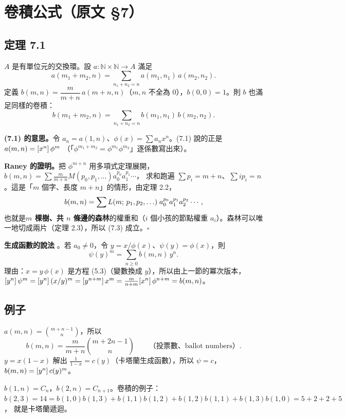\section{卷積公式（原文 §7）}\label{sec:conv}

\subsection{定理 7.1}

\begin{thmbox}[定理 7.1 \paper{p.~449}]
$A$ 是有單位元的交換環。設 $a:\mathbb N\times\mathbb N\to A$ 滿足
\begin{equation}\tag{7.1}
a(m_1+m_2,n)=\sum_{n_1+n_2=n}a(m_1,n_1)\,a(m_2,n_2).
\end{equation}
定義 $b(m,n)=\dfrac{m}{m+n}\,a(m+n,n)$（$m,n$ 不全為 0），$b(0,0)=1$。則 $b$ 也滿足同樣的卷積：
\begin{equation}\tag{7.3}
b(m_1+m_2,n)=\sum_{n_1+n_2=n}b(m_1,n_1)\,b(m_2,n_2).
\end{equation}
\end{thmbox}

\textbf{(7.1) 的意思。}令 $a_n=a(1,n)$、$\phi(x)=\sum a_nx^n$。(7.1) 說的正是 $a(m,n)=[x^n]\,\phi^m$
（「$\phi^{m_1+m_2}=\phi^{m_1}\phi^{m_2}$」逐係數寫出來）。

\textbf{Raney 的證明。}把 $\phi^{m+n}$ 用多項式定理展開，$b(m,n)=\sum\frac{m}{m+n}M(p_0,p_1,\ldots)a_0^{p_0}a_1^{p_1}\cdots$，
求和跑遍 $\sum p_i=m+n$、$\sum ip_i=n$。這是「$m$ 個字、長度 $m+n$」的情形，由定理 2.2，
\[
b(m,n)=\sum L(m;\,p_1,p_2,\ldots)\;a_0^{p_0}a_1^{p_1}a_2^{p_2}\cdots ,
\]
也就是\textbf{$m$ 棵樹、共 $n$ 條邊的森林}的權重和（$i$ 個小孩的節點權重 $a_i$）。森林可以唯一地切成兩片（定理 2.3），所以 (7.3) 成立。\hfill$\square$

\textbf{生成函數的說法} 。若 $a_0\neq0$，令 $y=x/\phi(x)$、$\psi(y)=\phi(x)$，則
\[
\psi(y)^m=\sum_{n\ge0}b(m,n)\,y^n .
\]
\extra{} 理由：$x=y\,\phi(x)$ 是方程 (5.3)（變數換成 $y$），所以由上一節的冪次版本，
$[y^n]\,\psi^m=[y^n]\,(x/y)^m=[y^{n+m}]\,x^m=\frac{m}{n+m}[x^n]\,\phi^{n+m}=b(m,n)$。

\subsection{例子}

\begin{exbox}[例 1：$\phi=\frac1{1-x}$，投票數]
$a(m,n)=\binom{m+n-1}{n}$，所以
\[
b(m,n)=\frac{m}{m+n}\binom{m+2n-1}{n}\qquad\text{（投票數、ballot numbers）}.
\]
$y=x(1-x)$ 解出 $\frac1{1-x}=c(y)$（卡塔蘭生成函數），所以 $\psi=c$，$b(m,n)=[y^n]\,c(y)^m$。
\begin{center}
\RanBallotTable
\end{center}
$b(1,n)=C_n$，$b(2,n)=C_{n+1}$。卷積的例子：$b(2,3)=14=b(1,0)b(1,3)+b(1,1)b(1,2)+b(1,2)b(1,1)+b(1,3)b(1,0)=5+2+2+5$，
就是卡塔蘭遞迴。
\end{exbox}

